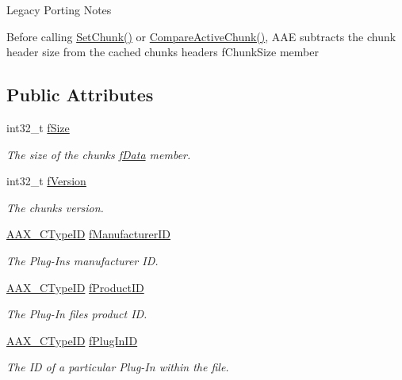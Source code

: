 \begin{DoxyRefDesc}{Legacy Porting Notes}
\begin{DoxyItemize}
\item Before calling \hyperlink{a00061_a2d780ebc594683e24302871b809602e8}{Set\+Chunk()} or \hyperlink{a00061_a1e86f849e970c9998313fc7d451ccf85}{Compare\+Active\+Chunk()}, A\+A\+E subtracts the chunk header size from the cached chunk\textquotesingle{}s header\textquotesingle{}s {\ttfamily f\+Chunk\+Size} member
\end{DoxyItemize}\end{DoxyRefDesc}
\subsection*{Public Attributes}
\begin{DoxyCompactItemize}
\item 
int32\+\_\+t \hyperlink{a00126_abaea87174a6d0dd1260644f6440591a6}{f\+Size}
\begin{DoxyCompactList}\small\item\em The size of the chunk\textquotesingle{}s \hyperlink{a00125_abc76d66fffa4a59ee5cfdbdd992c532c}{f\+Data} member. \end{DoxyCompactList}\item 
int32\+\_\+t \hyperlink{a00126_a543b3299cad8fd9a4de599d97a069a35}{f\+Version}
\begin{DoxyCompactList}\small\item\em The chunk\textquotesingle{}s version. \end{DoxyCompactList}\item 
\hyperlink{a00149_ac678f9c1fbcc26315d209f71a147a175}{A\+A\+X\+\_\+\+C\+Type\+I\+D} \hyperlink{a00126_a569567884784354c6be2824199ccb194}{f\+Manufacturer\+I\+D}
\begin{DoxyCompactList}\small\item\em The Plug-\/\+In\textquotesingle{}s manufacturer I\+D. \end{DoxyCompactList}\item 
\hyperlink{a00149_ac678f9c1fbcc26315d209f71a147a175}{A\+A\+X\+\_\+\+C\+Type\+I\+D} \hyperlink{a00126_afbed1db12ae1f7cb3204dad3fd66070e}{f\+Product\+I\+D}
\begin{DoxyCompactList}\small\item\em The Plug-\/\+In file\textquotesingle{}s product I\+D. \end{DoxyCompactList}\item 
\hyperlink{a00149_ac678f9c1fbcc26315d209f71a147a175}{A\+A\+X\+\_\+\+C\+Type\+I\+D} \hyperlink{a00126_a34e98621d17821659efb8ecdb4847ec5}{f\+Plug\+In\+I\+D}
\begin{DoxyCompactList}\small\item\em The I\+D of a particular Plug-\/\+In within the file. \end{DoxyCompactList}\item 

\end{DoxyCompactItemize}

